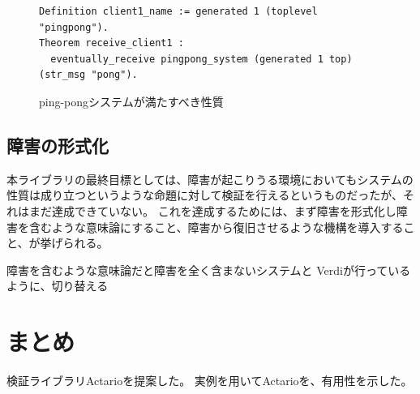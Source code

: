 \begin{figure}[tp]
  \begin{lstlisting}
Definition client1_name := generated 1 (toplevel "pingpong").
Theorem receive_client1 :
  eventually_receive pingpong_system (generated 1 top) (str_msg "pong").
  \end{lstlisting}
  \label{code:conclusion:pingpong-spec}
  \caption{ping-pongシステムが満たすべき性質}
\end{figure}

\subsection{障害の形式化}
本ライブラリの最終目標としては、障害が起こりうる環境においてもシステムの性質は成り立つというような命題に対して検証を行えるというものだったが、それはまだ達成できていない。
これを達成するためには、まず障害を形式化し障害を含むような意味論にすること、障害から復旧させるような機構を導入すること、が挙げられる。

障害を含むような意味論だと障害を全く含まないシステムと
Verdiが行っているように、切り替える




\section{まとめ}

検証ライブラリActarioを提案した。
実例を用いてActarioを、有用性を示した。
